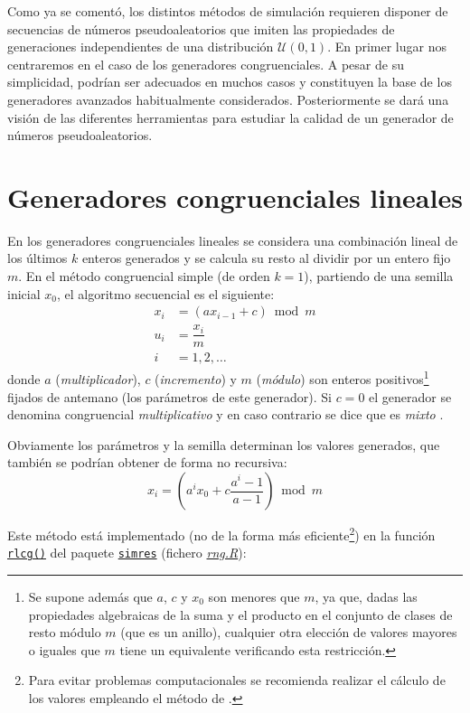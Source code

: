 \documentclass[
  spanish,
  10pt,
]{book}
\theoremstyle{break}
\theoremstyle{nonumberplain}
\let\oldfootnote\footnote
\renewcommand\footnote[1]{\oldfootnote{\hspace{2mm}#1}}
\begin{document}
Como ya se comentó, los distintos métodos de simulación requieren disponer de secuencias de números pseudoaleatorios que imiten las propiedades de generaciones independientes de una distribución \(\mathcal{U}(0,1)\).
En primer lugar nos centraremos en el caso de los generadores congruenciales. A pesar de su simplicidad, podrían ser adecuados en muchos casos y constituyen la base de los generadores avanzados habitualmente considerados.
Posteriormente se dará una visión de las diferentes herramientas para estudiar la calidad de un generador de números pseudoaleatorios.

\section{Generadores congruenciales lineales}\label{gen-cong}

En los generadores congruenciales lineales se considera una combinación lineal de los últimos \(k\) enteros generados y se calcula su resto al dividir por un entero fijo \(m\).
En el método congruencial simple (de orden \(k = 1\)), partiendo de una semilla inicial \(x_0\), el algoritmo secuencial es el siguiente:
\[\begin{aligned}
x_{i}  & = (ax_{i-1}+c) \bmod m \\
u_{i}  & = \dfrac{x_{i}}{m} \\
i  & =1,2,\ldots
\end{aligned}\]
donde \(a\) (\emph{multiplicador}), \(c\) (\emph{incremento}) y \(m\) (\emph{módulo}) son enteros positivos\footnote{Se supone además que \(a\), \(c\) y \(x_0\) son menores que \(m\), ya que, dadas las propiedades algebraicas de la suma y el producto en el conjunto de clases de resto módulo \(m\) (que es un anillo), cualquier otra elección de valores mayores o iguales que \(m\) tiene un equivalente verificando esta restricción.} fijados de antemano (los parámetros de este generador). Si \(c=0\) el generador se denomina congruencial \emph{multiplicativo} \citep{lehmer1951} y en caso contrario se dice que es \emph{mixto} \citep{rotenberg1960}.

Obviamente los parámetros y la semilla determinan los valores generados, que también se podrían obtener de forma no recursiva:
\[x_{i}=\left( a^{i}x_0+c\frac{a^{i}-1}{a-1}\right) \bmod m\]

Este método está implementado (no de la forma más eficiente\footnote{Para evitar problemas computacionales se recomienda realizar el cálculo de los valores empleando el método de \citeauthor{schrage1979} \citetext{\citeyear{schrage1979}; \citealp[ver e.g.][sec.~6.5.2]{bratley1983}}.}) en la función \href{https://rubenfcasal.github.io/simres/reference/set.rng.html}{\texttt{rlcg()}} del paquete \href{https://rubenfcasal.github.io/simres}{\texttt{simres}} (fichero \href{R/rng.R}{\emph{rng.R}}):
\end{document}
